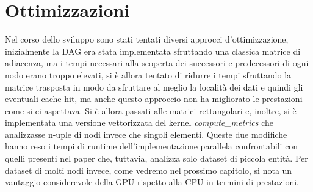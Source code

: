 \section{Ottimizzazioni}
Nel corso dello sviluppo sono stati tentati diversi approcci d'ottimizzazione, inizialmente la DAG era stata implementata sfruttando una classica matrice di adiacenza, ma i tempi necessari alla scoperta dei successori e predecessori di ogni nodo erano troppo elevati, si è allora tentato di ridurre i tempi sfruttando la matrice trasposta in modo da sfruttare al meglio la località dei dati e quindi gli eventuali cache hit, ma anche questo approccio non ha migliorato le prestazioni come si ci aspettava.
Si è allora passati alle matrici rettangolari e, inoltre, si è implementata una versione vettorizzata del kernel \textit{compute\_metrics} che analizzasse n-uple di nodi invece che singoli elementi.
Queste due modifiche hanno reso i tempi di runtime dell'implementazione parallela confrontabili con quelli presenti nel paper\cite{ilavarasan2007low} che, tuttavia, analizza solo dataset di piccola entità.
Per dataset di molti nodi invece, come vedremo nel prossimo capitolo, si nota un vantaggio considerevole della GPU rispetto alla CPU in termini di prestazioni.

\newpage

